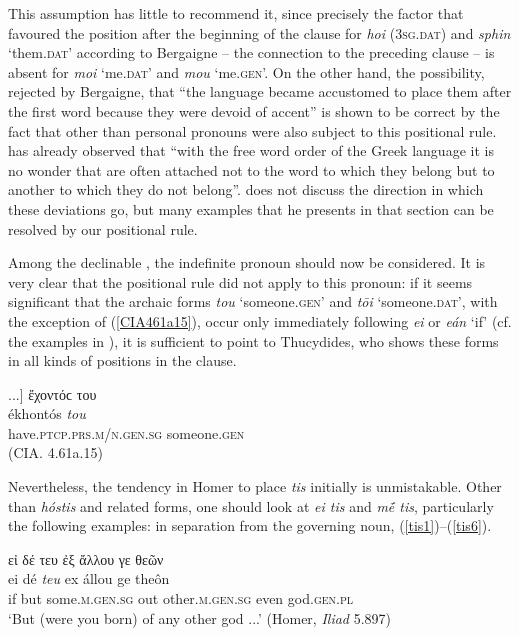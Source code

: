This assumption has little to recommend it, since precisely the factor that favoured the position after the beginning of the clause for \textit{hoi} (\textsc{3sg.dat}) and \textit{sphin} `them.\textsc{dat}' according to Bergaigne -- the connection to the preceding clause -- is absent for \textit{moi} `me.\textsc{dat}' and \textit{mou} `me.\textsc{gen}'. On the other hand, the possibility, rejected by Bergaigne, that ``the language became accustomed to place them after the first word because they were devoid of accent'' is shown to be correct by the fact that  other than personal pronouns were also subject to this positional rule. \citet[268, note 8]{Kuehner1869} has already observed that ``with the free word order of the Greek language it is no wonder that  are often attached not to the word to which they belong but to another to which they do not belong''. \citeauthor{Kuehner1869} does not discuss the direction in which these deviations go, but many examples that he presents in that section can be resolved by our positional rule.

Among the declinable , the indefinite pronoun should now be considered. It is very clear that the positional rule did not apply to this pronoun: if it seems significant that the archaic forms \textit{tou} `someone.\textsc{gen}' and \textit{tōi} `someone.\textsc{dat}', with the exception of (\ref{CIA461a15}), occur only immediately following \textit{ei} or \textit{eán} `if' (cf. the examples in \citealp[123, note 1106]{Meisterhans1888}), it is sufficient to point to Thucydides, who shows these forms in all kinds of positions in the clause.

\begin{exe}
\ex {[}...{]} ἔχοντόϲ του\\
\gll ékhontós \emph{tou}\\
have.\textsc{ptcp.prs.m/n.gen.sg} someone.\textsc{gen}\\
\trans (CIA. 4.61a.15)
\label{CIA461a15}
\end{exe}

Nevertheless, the tendency in Homer to place \textit{tis} initially is unmistakable. Other than \textit{hóstis} and related forms, one should look at \textit{ei tis} and \textit{mḗ tis}, particularly the following examples:\label{greekseparation} in separation from the governing noun, (\ref{tis1})--(\ref{tis6}).

\begin{exe}
\ex εἰ δέ τευ ἐξ ἄλλου γε θεῶν\\
\gll ei dé \emph{teu} ex állou ge theôn\\
if but some.\textsc{m.gen.sg} out other.\textsc{m.gen.sg} even god.\textsc{gen.pl}\\
\trans `But (were you born) of any other god ...' (Homer, \textit{Iliad} 5.897)
\label{tis1}
\end{exe}

